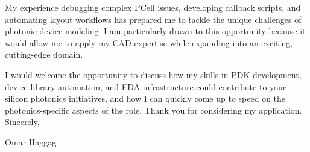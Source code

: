 \documentclass[11pt,a4paper]{article}
\begin{document}
My experience debugging complex PCell issues, developing callback scripts, and automating layout workflows has prepared me to tackle the unique challenges of photonic device modeling. I am particularly drawn to this opportunity because it would allow me to apply my CAD expertise while expanding into an exciting, cutting-edge domain.

I would welcome the opportunity to discuss how my skills in PDK development, device library automation, and EDA infrastructure could contribute to your silicon photonics initiatives, and how I can quickly come up to speed on the photonics-specific aspects of the role. Thank you for considering my application.
\vspace{2em}
Sincerely,

\vspace{2em}
Omar Haggag
\end{document}

